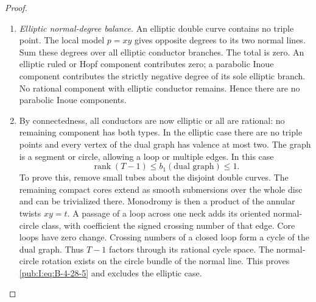 \begin{proof}
\begin{enumerate}[label=\arabic*.,leftmargin=*]
\item \emph{Elliptic normal-degree balance.}
An elliptic double curve contains no triple point.
The local model $p=xy$ gives opposite degrees to its
two normal lines. Sum these degrees over all elliptic
conductor branches. The total is zero. An elliptic
ruled or Hopf component contributes zero; a parabolic
Inoue component contributes the strictly negative
degree of its sole elliptic branch. No rational
component with elliptic conductor remains. Hence there
are no parabolic Inoue components.

\item By connectedness, all conductors are now elliptic or
all are rational: no remaining component has both
types. In the elliptic case there are no triple points
and every vertex of the dual graph has valence at most
two. The graph is a segment or circle, allowing a loop
or multiple edges. In this case
\begin{equation}
 \operatorname{rank}(T-1)\le b_1(\text{dual graph})
 \le1.
\label{pub:I:eq:B-4-28-5}
\end{equation}
To prove this, remove
small tubes about the disjoint double curves. The
remaining compact cores extend as smooth submersions
over the whole disc and can be trivialized there.
Monodromy is then a product of the annular twists
$xy=t$. A passage of a loop across one neck adds its
oriented normal-circle class, with coefficient the
signed crossing number of that edge. Core loops have
zero change. Crossing numbers of a closed loop form a
cycle of the dual graph. Thus $T-1$ factors through its
rational cycle space. The normal-circle rotation exists
on the circle bundle of the normal line. This proves
\eqref{pub:I:eq:B-4-28-5} and excludes the elliptic case.


\end{enumerate}
\end{proof}
